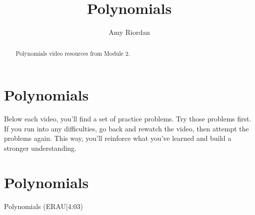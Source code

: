 \documentclass{ximera}
\title{Polynomials}
\author{Amy Riordan}
\begin{document}
\begin{abstract}
Polynomials video resources from Module 2.
\end{abstract}
\maketitle

\section*{Polynomials}

Below each video, you’ll find a set of practice problems. Try those problems first. If you run into any difficulties, go back and rewatch the video, then attempt the problems again. This way, you’ll reinforce what you’ve learned and build a stronger understanding.

\section*{Polynomials}

Polynomials (ERAU|4:03)

\end{document}
